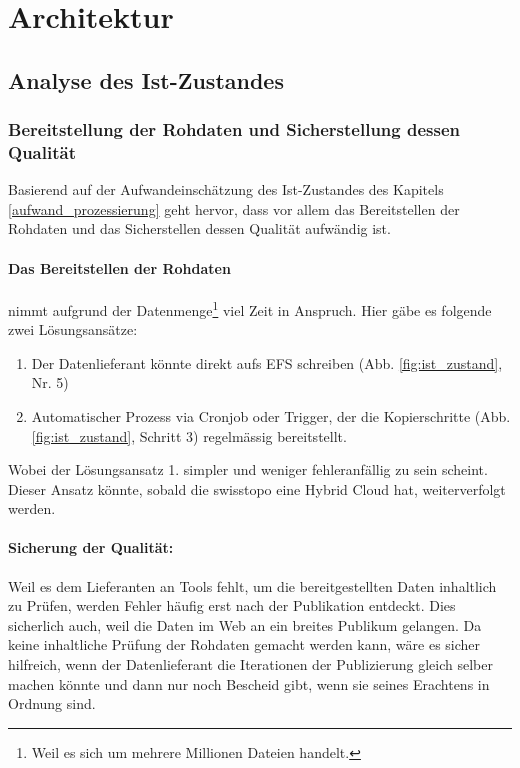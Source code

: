 \section{Architektur}

\subsection{Analyse des Ist-Zustandes}
\subsubsection{Bereitstellung der Rohdaten und Sicherstellung dessen Qualität}\label{kap:sicherstellung_qualitaet}
Basierend auf der Aufwandeinschätzung des Ist-Zustandes des Kapitels \ref{aufwand_prozessierung} geht hervor, dass vor allem das Bereitstellen der Rohdaten und das Sicherstellen dessen Qualität aufwändig ist. 

\paragraph{Das Bereitstellen der Rohdaten} nimmt aufgrund der Datenmenge\footnote{Weil es sich um mehrere Millionen Dateien handelt.} viel Zeit in Anspruch. Hier gäbe es folgende zwei Lösungsansätze:
\begin{enumerate}
\item Der Datenlieferant könnte direkt aufs EFS schreiben (Abb. \ref{fig:ist_zustand}, Nr. 5)
\item Automatischer Prozess via Cronjob oder Trigger, der die Kopierschritte (Abb. \ref{fig:ist_zustand}, Schritt 3) regelmässig bereitstellt.
\end{enumerate}

Wobei der Lösungsansatz 1. simpler und weniger fehleranfällig zu sein scheint. Dieser Ansatz könnte, sobald die swisstopo eine Hybrid Cloud hat, weiterverfolgt werden.

\paragraph{Sicherung der Qualität:} Weil es dem Lieferanten an Tools fehlt, um die bereitgestellten Daten inhaltlich zu Prüfen, werden Fehler 
häufig erst nach der Publikation entdeckt. Dies sicherlich auch, weil die Daten im Web an ein breites Publikum gelangen. Da keine inhaltliche Prüfung der Rohdaten gemacht werden kann, wäre es sicher hilfreich, wenn der Datenlieferant die Iterationen der Publizierung gleich selber machen könnte und dann nur noch Bescheid gibt, wenn sie seines Erachtens in Ordnung sind.


